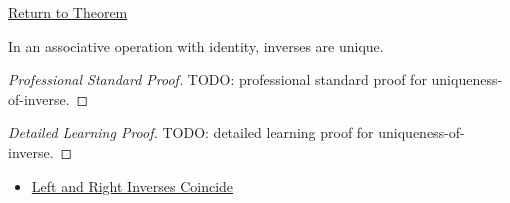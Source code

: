 \newpage
{}
\label{prf:uniqueness-of-inverse}

\begin{remark*}[Return]
\hyperref[thm:uniqueness-of-inverse]{Return to Theorem}
\end{remark*}

\begin{theorem*}
In an associative operation with identity, inverses are unique.
\end{theorem*}

\begin{proof}[Professional Standard Proof]
\LRAProofBodyStart
TODO: professional standard proof for uniqueness-of-inverse.
\end{proof}

\begin{proof}[Detailed Learning Proof]
\LRAProofBodyStart
TODO: detailed learning proof for uniqueness-of-inverse.
\end{proof}

\begin{remark*}
\end{remark*}

\begin{dependencies}
\begin{itemize}
  \item \hyperref[lem:left-right-inverses-coincide]{Left and Right Inverses Coincide}
\end{itemize}
\end{dependencies}

\clearpage
